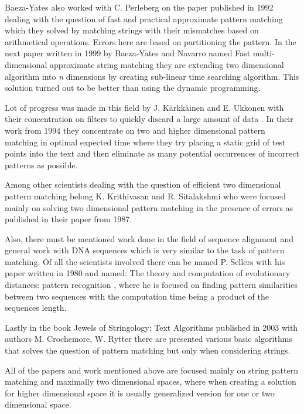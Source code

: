 Baeza-Yates also worked with C. Perleberg on the paper published in 1992 \cite{fastApproxStringMatching} dealing with the question of fast and practical approximate pattern matching which they solved by matching strings with their mismatches based on arithmetical operations. Errors here are based on partitioning the pattern. In the next paper written in 1999 by Baeza-Yates and Navarro named Fast multi-dimensional approximate string matching \cite{fastMDApproxPM} they are extending two dimensional algorithm into \textit{n} dimensions by creating sub-linear time searching algorithm. This solution turned out to be better than using the dynamic programming.

Lot of progress was made in this field by J. K{\" a}rkk{\" a}inen and E. Ukkonen with their concentration on filters to quickly discard a large amount of data \cite{karkoptimal}. In their work from 1994 they concentrate on two and higher dimensional pattern matching in optimal expected time where they try placing a static grid of test points into the text and then eliminate as many potential occurrences of incorrect patterns as possible.

Among other scientists dealing with the question of efficient two dimensional pattern matching belong K. Krithivasan and R. Sitalakshmi \cite{effPMerr} who were focused mainly on solving two dimensional pattern matching in the presence of errors as published in their paper from 1987.

Also, there must be mentioned work done in the field of sequence alignment and general work with DNA sequences which is very similar to the task of pattern matching. Of all the scientists involved there can be named P. Sellers with his paper written in 1980 and named: The theory and computation of evolutionary distances: pattern recognition \cite{evolDistances}, where he is focused on finding pattern similarities between two sequences with the computation time being a product of the sequences length.

Lastly in the book Jewels of Stringology: Text Algorithms published in 2003 \cite{stringJewels} with authors M. Crochemore, W. Rytter there are presented various basic algorithms that solves the question of pattern matching but only when considering strings.

All of the papers and work mentioned above are focused mainly on string pattern matching and maximally two dimensional spaces, where when creating a solution for higher dimensional space it is usually generalized version for one or two dimensional space.

